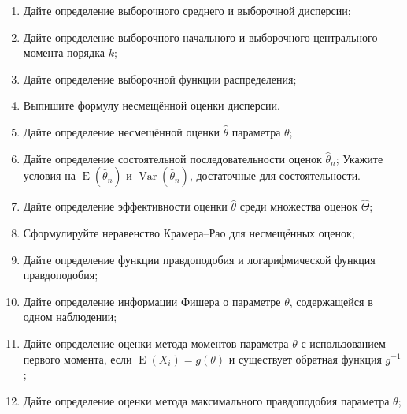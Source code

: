 \documentclass[12pt]{article}
\DeclareMathOperator{\Var}{Var}
\DeclareMathOperator{\E}{E}
\begin{document}
  \begin{enumerate}[resume]
      \item Дайте определение выборочного среднего и выборочной дисперсии;
      \item Дайте определение выборочного начального и выборочного центрального момента порядка $k$;
      \item Дайте определение выборочной функции распределения;
      \item Выпишите формулу несмещённой оценки дисперсии. 
      \item Дайте определение несмещённой оценки $\hat \theta$ параметра $\theta$;
      \item Дайте определение состоятельной последовательности оценок $\hat \theta_n$; 
      Укажите условия на $\E(\hat\theta_n)$ и $\Var(\hat\theta_n)$, достаточные для состоятельности.
      \item Дайте определение эффективности оценки $\hat \theta$ среди множества оценок $\hat \Theta$;  
      \item Сформулируйте неравенство Крамера–Рао для несмещённых оценок;
      \item Дайте определение функции правдоподобия и логарифмической функция правдоподобия;
      \item Дайте определение информации Фишера о параметре $\theta$, содержащейся в одном наблюдении;
      \item Дайте определение оценки метода моментов параметра $\theta$ с использованием первого момента,
      если $\E(X_i)=g(\theta)$ и существует обратная функция $g^{-1}$;
    \item Дайте определение оценки метода максимального правдоподобия параметра $\theta$;
  \end{enumerate}
  
\end{document}
